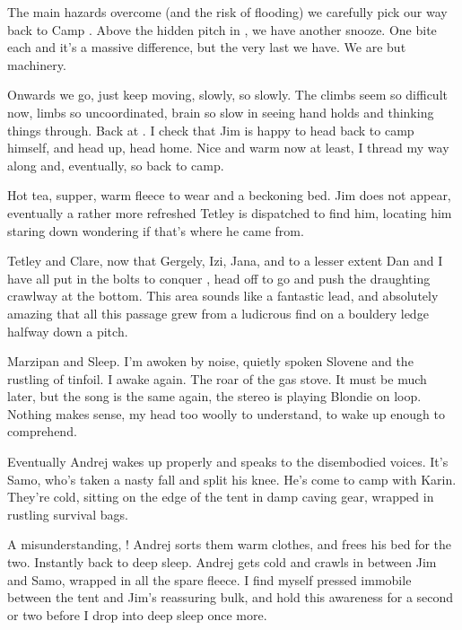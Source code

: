 The main hazards overcome (and the risk of flooding) we carefully pick
our way back to Camp . Above the hidden pitch in ,
we have another snooze.  One bite each and it's
a massive difference, but the very last we have. We are but machinery.

Onwards we go, just keep moving, slowly, so slowly. The climbs seem so
difficult now, limbs so uncoordinated, brain so slow in seeing hand
holds and thinking things through. Back at . I check that Jim is happy to head back to camp himself, and
head up, head home. Nice and warm now at least, I thread my way along
 and, eventually, so back to camp.

Hot tea, supper, warm fleece to wear and a beckoning bed. Jim does not
appear, eventually a rather more refreshed Tetley is dispatched to find
him, locating him staring down  wondering if that's where
he came from.

Tetley and Clare, now that Gergely, Izi, Jana, and to a lesser extent
Dan and I have all put in the bolts to conquer ,
head off to go and push the draughting crawlway at the bottom. This area
sounds like a fantastic lead, and absolutely amazing that all this
passage grew from a ludicrous find on a bouldery ledge halfway down a
pitch.


Marzipan and Sleep. I'm awoken by noise, quietly spoken Slovene and the
rustling of tinfoil. I awake again. The roar of the gas stove. It must
be much later, but the song is the same again, the stereo is playing
Blondie on loop. Nothing makes sense, my head too woolly to understand,
to wake up enough to comprehend.

Eventually Andrej wakes up properly and speaks to the disembodied
voices. It's Samo, who's taken a nasty fall and split his knee. He's
come to camp with Karin. They're cold, sitting on the edge of the tent
in damp caving gear, wrapped in rustling survival bags.

A misunderstanding, ! Andrej sorts them warm clothes, and
frees his bed for the two. Instantly back to deep sleep. Andrej gets
cold and crawls in between Jim and Samo, wrapped in all the spare
fleece. I find myself pressed immobile between the tent and Jim's
reassuring bulk, and hold this awareness for a second or two before I
drop into deep sleep once more.

